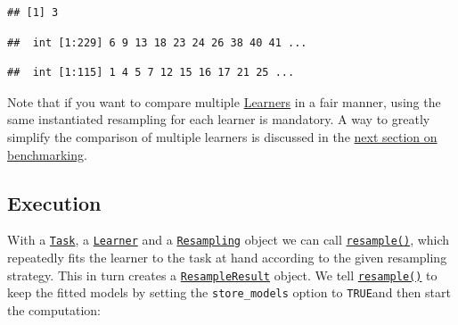 \documentclass[
]{scrbook}
\newenvironment{Shaded}{\begin{snugshade}}{\end{snugshade}}
\newcommand{\AttributeTok}[1]{\textcolor[rgb]{0.77,0.63,0.00}{#1}}
\newcommand{\DecValTok}[1]{\textcolor[rgb]{0.00,0.00,0.81}{#1}}
\newcommand{\FunctionTok}[1]{\textcolor[rgb]{0.00,0.00,0.00}{#1}}
\newcommand{\NormalTok}[1]{#1}
\newcommand{\OtherTok}[1]{\textcolor[rgb]{0.56,0.35,0.01}{#1}}
\newcommand{\SpecialCharTok}[1]{\textcolor[rgb]{0.00,0.00,0.00}{#1}}
\newcommand{\StringTok}[1]{\textcolor[rgb]{0.31,0.60,0.02}{#1}}
\renewenvironment{Shaded} {\begin{snugshade}\small} {\end{snugshade}}
\begin{document}
\begin{Shaded}
\end{Shaded}

\begin{verbatim}
## [1] 3
\end{verbatim}

\begin{Shaded}
\end{Shaded}

\begin{verbatim}
##  int [1:229] 6 9 13 18 23 24 26 38 40 41 ...
\end{verbatim}

\begin{Shaded}
\end{Shaded}

\begin{verbatim}
##  int [1:115] 1 4 5 7 12 15 16 17 21 25 ...
\end{verbatim}

Note that if you want to compare multiple \protect\hyperlink{learners}{Learners} in a fair manner, using the same instantiated resampling for each learner is mandatory.
A way to greatly simplify the comparison of multiple learners is discussed in the \protect\hyperlink{benchmarking}{next section on benchmarking}.

\hypertarget{resampling-exec}{%
\subsection{Execution}\label{resampling-exec}}

With a \href{https://mlr3.mlr-org.com/reference/Task.html}{\texttt{Task}}, a \href{https://mlr3.mlr-org.com/reference/Learner.html}{\texttt{Learner}} and a \href{https://mlr3.mlr-org.com/reference/Resampling.html}{\texttt{Resampling}} object we can call \href{https://mlr3.mlr-org.com/reference/resample.html}{\texttt{resample()}}, which repeatedly fits the learner to the task at hand according to the given resampling strategy.
This in turn creates a \href{https://mlr3.mlr-org.com/reference/ResampleResult.html}{\texttt{ResampleResult}} object.
We tell \href{https://mlr3.mlr-org.com/reference/resample.html}{\texttt{resample()}} to keep the fitted models by setting the \texttt{store\_models} option to \texttt{TRUE}and then start the computation:
\end{document}
